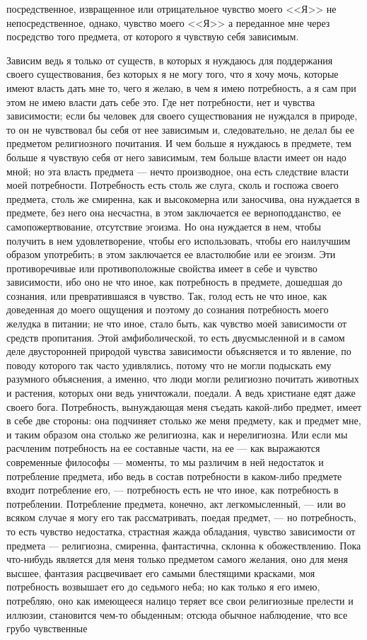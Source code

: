 \documentclass[12pt]{article}
\begin{document}
посредственное, извращенное или отрицательное чувство моего <<Я>>  не непосредственное, однако, чувство моего <<Я>>  а переданное мне через посредство того предмета, от которого я чувствую себя зависимым. 

Зависим ведь я только от существ, в которых я нуждаюсь для поддержания своего существования, без которых я не могу того, что я хочу мочь, которые имеют власть дать мне то, чего я желаю, в чем я имею потребность, а я сам при этом не имею власти дать себе это. Где нет потребности, нет и чувства зависимости; если бы человек для своего существования не нуждался в природе, то он не чувствовал бы себя от нее зависимым и, следовательно, не делал бы ее предметом религиозного почитания. И чем больше я нуждаюсь в предмете, тем больше я чувствую себя от него зависимым, тем больше власти имеет он надо мной; но эта власть предмета --- нечто производное, она есть следствие власти моей потребности. Потребность есть столь же слуга, сколь и госпожа своего предмета, столь же смиренна, как и высокомерна или заносчива, она нуждается в предмете, без него она несчастна, в этом заключается ее верноподданство, ее самопожертвование, отсутствие эгоизма. Но она нуждается в нем, чтобы получить в нем удовлетворение, чтобы его использовать, чтобы его наилучшим образом употребить; в этом заключается ее властолюбие или ее эгоизм. Эти противоречивые или противоположные свойства имеет в себе и чувство зависимости, ибо оно не что иное, как потребность в предмете, дошедшая до сознания, или превратившаяся в чувство. Так, голод есть не что иное, как доведенная до моего ощущения и поэтому до сознания потребность моего желудка в питании; не что иное, стало быть, как чувство моей зависимости от средств пропитания. Этой амфиболической, то есть двусмысленной и в самом деле двусторонней природой чувства зависимости объясняется и то явление, по поводу которого так часто удивлялись, потому что не могли подыскать ему разумного объяснения, а именно, что люди могли религиозно почитать животных и растения, которых они ведь уничтожали, поедали. А ведь христиане едят даже своего бога. Потребность, вынуждающая меня съедать какой-либо предмет, имеет в себе две стороны: она подчиняет столько же меня предмету, как и предмет мне, и таким образом она столько же религиозна, как и нерелигиозна. Или если мы расчленим потребность на ее составные части, на ее --- как выражаются современные философы --- моменты, то мы различим в ней недостаток и потребление предмета, ибо ведь в состав потребности в каком-либо предмете входит потребление его, --- потребность есть не что иное, как потребность в потреблении. Потребление предмета, конечно, акт легкомысленный, --- или во всяком случае я могу его так рассматривать, поедая предмет, --- но потребность, то есть чувство недостатка, страстная жажда обладания, чувство зависимости от предмета --- религиозна, смиренна, фантастична, склонна к обожествлению. Пока что-нибудь является для меня только предметом самого желания, оно для меня высшее, фантазия расцвечивает его самыми блестящими красками, моя потребность возвышает его до седьмого неба; но как только я его имею, потребляю, оно как имеющееся налицо теряет все свои религиозные прелести и иллюзии, становится чем-то обыденным; отсюда обычное наблюдение, что все грубо чувственные 
\end{document}
